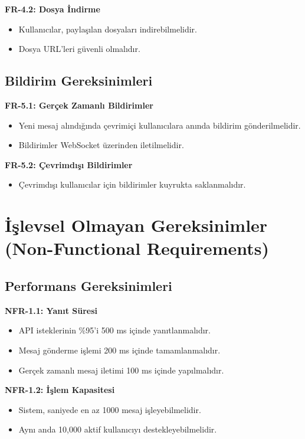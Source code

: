 \textbf{FR-4.2: Dosya İndirme}
\begin{itemize}
    \item Kullanıcılar, paylaşılan dosyaları indirebilmelidir.
    \item Dosya URL'leri güvenli olmalıdır.
\end{itemize}

\subsection{Bildirim Gereksinimleri}
\textbf{FR-5.1: Gerçek Zamanlı Bildirimler}
\begin{itemize}
    \item Yeni mesaj alındığında çevrimiçi kullanıcılara anında bildirim gönderilmelidir.
    \item Bildirimler WebSocket üzerinden iletilmelidir.
\end{itemize}

\textbf{FR-5.2: Çevrimdışı Bildirimler}
\begin{itemize}
    \item Çevrimdışı kullanıcılar için bildirimler kuyrukta saklanmalıdır.
\end{itemize}

\section{İşlevsel Olmayan Gereksinimler (Non-Functional Requirements)}

\subsection{Performans Gereksinimleri}
\textbf{NFR-1.1: Yanıt Süresi}
\begin{itemize}
    \item API isteklerinin \%95'i 500 ms içinde yanıtlanmalıdır.
    \item Mesaj gönderme işlemi 200 ms içinde tamamlanmalıdır.
    \item Gerçek zamanlı mesaj iletimi 100 ms içinde yapılmalıdır.
\end{itemize}

\textbf{NFR-1.2: İşlem Kapasitesi}
\begin{itemize}
    \item Sistem, saniyede en az 1000 mesaj işleyebilmelidir.
    \item Aynı anda 10,000 aktif kullanıcıyı destekleyebilmelidir.
\end{itemize}

